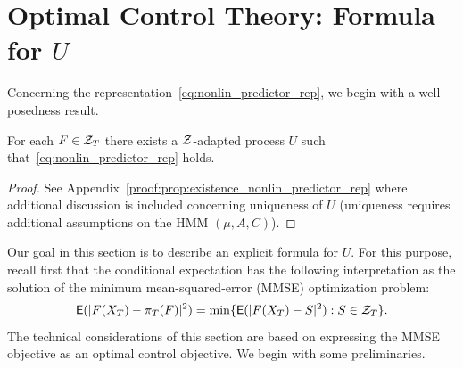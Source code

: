 \documentclass[twoside,11pt]{article}
\def\clZ{{\cal Z}}
\def\E{{\sf E}}
\def\clZ{{\cal Z}}
\def\E{{\sf E}}
\def\clZ{{\cal Z}}
\def\clZ{{\cal Z}}
\def\E{{\sf E}}
\begin{document}

\section{Optimal Control Theory: Formula for $U$}
\label{sec:theory}


Concerning the representation~\eqref{eq:nonlin_predictor_rep}, we begin with a well-posedness result.  


\begin{proposition}\label{prop:existence_nonlin_predictor_rep}
  For each $F\in\clZ_T$ there exists a $\clZ$-adapted process $U$ such that~\eqref{eq:nonlin_predictor_rep} holds. 
\end{proposition}

\begin{proof}
  See Appendix~\ref{proof:prop:existence_nonlin_predictor_rep} where additional discussion is included concerning uniqueness of $U$ (uniqueness requires additional assumptions on the HMM $(\mu, A, C)$).
\end{proof}

Our goal in this section is to describe an explicit formula for $U$. 
For this purpose, recall first that the conditional expectation has the following interpretation as the solution of the minimum mean-squared-error (MMSE) optimization problem:
\begin{equation*}\label{eq:minimum-variance}
  \E(|F(X_T) - \pi_T(F)|^2) = \min\{\E(|F(X_T) - S|^2) : S\in \clZ_T\}.
\end{equation*}
The technical considerations of this section are based on expressing the MMSE
objective as an optimal control objective.  We begin with some
preliminaries.
\end{document}
